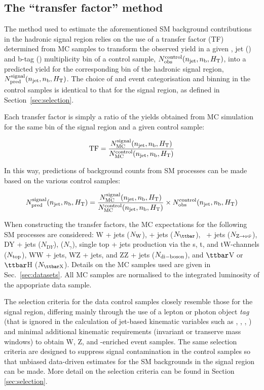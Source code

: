 \subsection{The ``transfer factor'' method}
\label{sec:ewk-method}

The method used to estimate the aforementioned SM background
contributions in the hadronic signal region relies on the use of a
transfer factor (TF) determined from MC samples to transform the
observed yield in a given \scalht, jet (\njet) and b-tag (\nb)
multiplicity bin of a control sample, $N_{\textrm{obs}}^{\rm
  control}(n_{\text{jet}},n_{\text{b}},\mbox{$H_\text{T}$})$, into a predicted yield for the
corresponding bin of the hadronic signal region, $N_{\textrm{pred}}^{\rm
  signal}(n_{\text{jet}},n_{\text{b}},\mbox{$H_\text{T}$})$. The choice of \njet and \nb event
categorisation and \scalht binning in the control samples is identical
to that for the signal region, as defined in
Section~\ref{sec:selection}. 

Each transfer factor is simply a ratio of the yields obtained from MC
simulation for the same bin of the signal region and a given control
sample:

\begin{equation}
  \label{equ:tf-ratio}
  {\rm TF} = \frac{N_{\rm MC}^{\rm signal}(n_{\text{jet}},n_{\text{b}},\mbox{$H_\text{T}$})}{N_{\rm
      MC}^{\rm control}(n_{\text{jet}},n_{\text{b}},\mbox{$H_\text{T}$})} 
\end{equation}

In this way, predictions of background counts from SM processes can be
made based on the various control samples:

\begin{equation}
  \label{equ:pred-method}
  N_{\textrm{pred}}^{\rm signal}(n_{\text{jet}},n_{\text{b}},\mbox{$H_\text{T}$}) = \frac{N_{\rm MC}^{\rm
      signal}(n_{\text{jet}},n_{\text{b}},\mbox{$H_\text{T}$})}{N_{\rm MC}^{\rm
      control}(n_{\text{jet}},n_{\text{b}},\mbox{$H_\text{T}$})} \times N_{\textrm{obs}}^{\rm
    control}(n_{\text{jet}},n_{\text{b}},\mbox{$H_\text{T}$})   
\end{equation}

When constructing the transfer factors, the MC expectations for the
following SM processes are considered: W + jets ($N_{\rm W}$), \ttbar
+ jets ($N_{\ttbar}$), \znunu\ + jets ($N_{{\text Z} \rightarrow \nu\bar{\nu}}$), DY + jets
($N_{\mathrm DY}$), \gj ($N_\gamma$), single top + jets
production via the s, t, and tW-channels ($N_{\rm top}$), WW +
jets, WZ + jets, and ZZ + jets ($N_{\rm di-boson}$), and $\ttbar$V or
$\ttbar$H ($N_{\rm {\ttbar}X}$). Details on the MC
samples used are given in Sec.~\ref{sec:datasets}. All MC samples
are normalised to the integrated luminosity of the appopriate data
sample.

The selection criteria for the data control samples closely resemble
those for the signal region, differing mainly through the use of a
lepton or photon object {\it tag} (that is ignored in the calculation
of jet-based kinematic variables such as \scalht, \mht, \alphat, \etc)
and minimal additional kinematic requirements (\eg invariant or
transerve mass windows) to obtain W, Z, and \ttbar-enriched event
samples. The same selection criteria are designed to suppress signal
contamination in the control samples so that unbiased data-driven
estimates for the SM backgrounds in the signal region can be
made. More detail on the selection criteria can be found in Section
\ref{sec:selection}.

